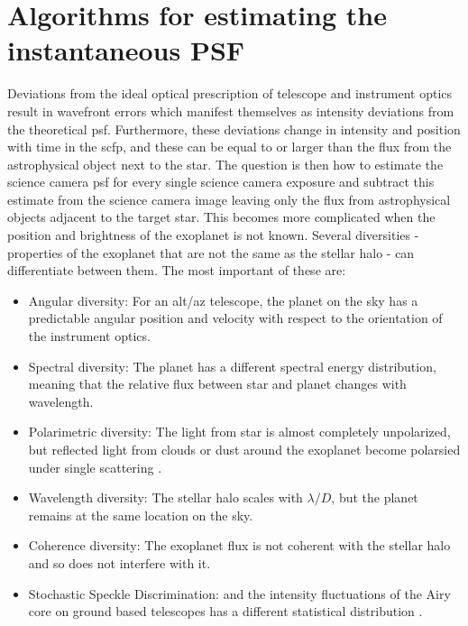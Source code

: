\documentclass[letterpaper]{ar-1col}
\newcommand{\ld}{$\lambda/D$}
\begin{document}
\section{Algorithms for estimating the instantaneous PSF}

Deviations from the ideal optical prescription of telescope and instrument optics result in wavefront errors which manifest themselves as intensity deviations from the theoretical \ac{psf}.
%
Furthermore, these deviations change in intensity and position with time in the \ac{scfp}, and these can be equal to or larger than the flux from the astrophysical object next to the star.
%
The question is then how to estimate the science camera \ac{psf} for every single science camera exposure and subtract this estimate from the science camera image leaving only the flux from astrophysical objects adjacent to the target star.
%
This becomes more complicated when the position and brightness of the exoplanet is not known.
%
Several diversities - properties of the exoplanet that are not the same as the stellar halo - can differentiate between them.
%
The most important of these are:

\begin{itemize}
    \item Angular diversity: For an alt/az telescope, the planet on the sky has a predictable angular position and velocity with respect to the orientation of the instrument optics.
    \item Spectral diversity: The planet has a different spectral energy distribution, meaning that the relative flux between star and planet changes with wavelength.
    \item Polarimetric diversity: The light from star is almost completely unpolarized, but reflected light from clouds or dust around the exoplanet become polarsied under single scattering \citep{Gledhill91}.
    \item Wavelength diversity: The stellar halo scales with \ld{}, but the planet remains at the same location on the sky.
    \item Coherence diversity: The exoplanet flux is not coherent with the stellar halo and so does not interfere with it.
    \item Stochastic Speckle Discrimination: and the intensity fluctuations of the Airy core on ground based telescopes has a different statistical distribution \citep{Gladysz09}.
\end{itemize}
\end{document}
